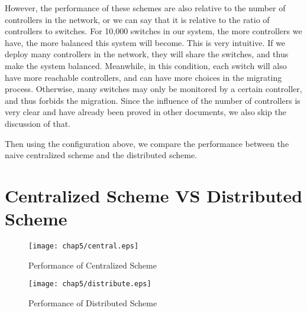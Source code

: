 However, the performance of these schemes are also relative to the number of controllers in the network, or we can say that it is relative to the ratio of controllers to switches. For 10,000 switches in our system, the more controllers we have, the more balanced this system will become. This is very intuitive. If we deploy many controllers in the network, they will share the switches, and thus make the system balanced. Meanwhile, in this condition, each switch will also have more reachable controllers, and can have more choices in the migrating process. Otherwise, many switches may only be monitored by a certain controller, and thus forbids the migration. Since the influence of the number of controllers is very clear and have already been proved in other documents, we also skip the discussion of that.

Then using the configuration above, we compare the performance between the naive centralized scheme and the distributed scheme.

\vspace{-5pt}
\section{Centralized Scheme VS Distributed Scheme}

\begin{figure}[!htbp]
\begin{minipage}[t]{0.45\textwidth}
    \centering
    \texttt{[image: chap5/central.eps]}
    \caption{Performance of Centralized Scheme}\label{central}
  \end{minipage}\hspace{0.3cm}
  \begin{minipage}[t]{0.45\textwidth}
    \centering
    \texttt{[image: chap5/distribute.eps]}
  \caption{Performance of Distributed Scheme}\label{distribute}
  \end{minipage}\hspace{0.3cm}
\end{figure}

